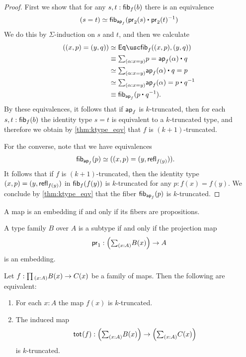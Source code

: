 \begin{proof}
First we show that for any $s,t:\mathsf{fib}_{f}(b)$ there is an equivalence
\begin{equation*}
\eqv{(s=t)}{\fib{\apfunc{f}}{\ct{\proj 2(s)}{\proj 2(t)^{-1}}}}
\end{equation*}
We do this by $\Sigma$-induction on $s$ and $t$, and then we calculate
\begin{align*}
(\pairr{x,p}=\pairr{y,q}) & \eqvsym \Eqfib_f((x,p),(y,q)) \\
  & \jdeq \sm{\alpha:x=y} p=\ct{\ap{f}{\alpha}}{q} \\
  & \eqvsym \sm{\alpha:x=y} \ct{\ap{f}{\alpha}}{q}=p \\
& \eqvsym \sm{\alpha:x=y} \ap{f}{\alpha}=\ct{p}{q^{-1}} \\
& \jdeq \fib{\apfunc{f}}{\ct{p}{q^{-1}}}.
\end{align*}
By these equivalences, it follows that if $\mathsf{ap}_{f}$ is $k$-truncated, then for each $s,t:\mathsf{fib}_{f}(b)$ the identity type $s=t$ is equivalent to a $k$-truncated type, and therefore we obtain by \cref{thm:ktype_eqv} that $f$ is $(k+1)$-truncated.

For the converse, note that we have equivalences
\begin{align*}
\mathsf{fib}_{\mathsf{ap}_{f}}(p) & \simeq ((x,p)=(y,\mathsf{refl}_{f(y)})).
\end{align*}
It follows that if $f$ is $(k+1)$-truncated, then the identity type $(x,p)=(y,\mathsf{refl}_{f(y)})$ in $\mathsf{fib}_{f}(f(y))$ is $k$-truncated for any $p:f(x)=f(y)$. We conclude by \cref{thm:ktype_eqv} that the fiber $\mathsf{fib}_{\mathsf{ap}_{f}}(p)$ is $k$-truncated. 
\end{proof}

\begin{cor}\label{cor:prop_emb}
A map is an embedding if and only if its fibers are propositions.
\end{cor}

\begin{cor}\label{thm:subtype}
A type family $B$ over $A$ is a subtype if and only if the projection map
\begin{equation*}
\proj 1 : \Big(\sm{x:A}B(x)\Big)\to A
\end{equation*}
is an embedding.
\end{cor}

\begin{thm}
Let $f:\prd{x:A}B(x)\to C(x)$ be a family of maps. Then the following are equivalent:
\begin{enumerate}
\item For each $x:A$ the map $f(x)$ is $k$-truncated.
\item The induced map 
\begin{equation*}
\total{f}:\Big(\sm{x:A}B(x)\Big)\to\Big(\sm{x:A}C(x)\Big)
\end{equation*}
is $k$-truncated.
\end{enumerate}
\end{thm}

